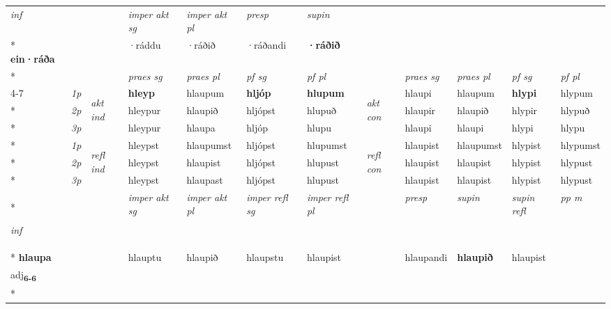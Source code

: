 \begin{longtable}[l]{X>{\footnotesize\itshape}llXXXXlXXXX}
   {\textit{inf}} & &  & \textit{imper akt sg} & \textit{imper akt pl}   & \textit{presp} & \textit{supin}   \\*
  {\textbf{ein\allowbreak ·ráða}} & && ·ráddu  & ·ráðið   & ·ráðandi &  \textbf{·ráðið}   \\*

\midrule

 & &   & \textit{praes sg}  & \textit{praes pl}    & \textit{ pf sg} & \textit{pf pl} & & \textit{praes sg}  & \textit{praes pl}    & \textit{pf sg} & \textit{pf pl }  \\ \cmidrule{4-7} \cmidrule{9-12}
 \multirow{2}{*}{{{\textbf{v{\textsubscript{6}}} \Large{\textbf{90}}}}}  & 1p & \multirow{3}{*}{\begin{turn}{90}\textit{akt ind}\end{turn}} & \textbf{hleyp} & hlaupum & \textbf{hljóp} & \textbf{hlupum} & \multirow{3}{*}{\begin{turn}{90}\textit{akt con}\end{turn}} &hlaupi & hlaupum & \textbf{hlypi} & hlypum\\*
 & 2p &  &  hleypur  & hlaupið & hljópst & hlupuð & & hlaupir & hlaupið & hlypir & hlypuð \\*
 & 3p &  & hleypur & hlaupa & hljóp & hlupu & & hlaupi & hlaupi& hlypi & hlypu \\*
\cmidrule{4-7} \cmidrule{9-12}
 & 1p & \multirow{3}{*}{\begin{turn}{90}\textit{refl ind}\end{turn}}  & hleypst & hlaupumst & hljópst & hlupumst & \multirow{3}{*}{\begin{turn}{90}\textit{refl con}\end{turn}}  &hlaupist & hlaupumst & hlypist & hlypumst \\*
 & 2p &  & hleypst & hlaupist & hljópst & hlupust & &hlaupist & hlaupist & hlypist & hlypust \\*
 & 3p  & & hleypst & hlaupast & hljópst & hlupust & & hlaupist & hlaupist& hlypist & hlypust \\*
\cmidrule{4-7} \cmidrule{9-12}

   {\textit{inf}} & &  & \textit{imper akt sg} & \textit{imper akt pl} & \textit{imper refl sg} & \textit{imper refl pl} && \textit{presp} & \textit{supin} & \textit{supin refl} & \textit{pp m} \\*
  {\textbf{hlaupa}} & && hlauptu  & hlaupið & hlaupstu & hlaupist && hlaupandi &  \textbf{hlaupið} & hlaupist & \specialcell{\textbf{hlaupinn} \\ adj\textbf{\textsubscript{6-6}}} \\*


\end{longtable}
